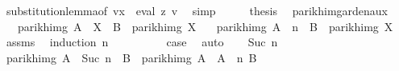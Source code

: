 \begin{isabellebody}
\ substitution{\isacharunderscore}{\kern0pt}lemma{\isacharbrackleft}{\kern0pt}of\ {\isachardoublequoteopen}{\isacharquery}{\kern0pt}v{\isacharprime}{\kern0pt}{\isacharparenleft}{\kern0pt}x\ {\isacharcolon}{\kern0pt}{\isacharequal}{\kern0pt}\ eval\ z\ v{\isacharparenright}{\kern0pt}{\isachardoublequoteclose}{\isacharbrackright}{\kern0pt}\ \isamarkupfalse%
\ simp\isanewline
\ \ \isamarkupfalse%
\ \isamarkupfalse%
\ {\isacharquery}{\kern0pt}thesis\ \isakeywordONE{{\isachardot}{\kern0pt}}\isamarkupfalse%
\isanewline
{}\isamarkupfalse%
%
\endisatagproof
{\isafoldproof}%
%
\isadelimproof
%
\endisadelimproof
%
\isadelimdocument
%
\endisadelimdocument
%
\isatagdocument
%
\isamarkuptrue%
%
\endisatagdocument
{\isafolddocument}%
%
\isadelimdocument
%
\endisadelimdocument
{}\isamarkupfalse%
\ parikh{\isacharunderscore}{\kern0pt}img{\isacharunderscore}{\kern0pt}arden{\isacharunderscore}{\kern0pt}aux{\isacharcolon}{\kern0pt}\isanewline
\ \ \ {\isachardoublequoteopen}parikh{\isacharunderscore}{\kern0pt}img\ {\isacharparenleft}{\kern0pt}A\ {\isacharat}{\kern0pt}{\isacharat}{\kern0pt}\ X\ {\isasymunion}\ B{\isacharparenright}{\kern0pt}\ {\isasymsubseteq}\ parikh{\isacharunderscore}{\kern0pt}img\ X{\isachardoublequoteclose}\isanewline
\ \ \ {\isachardoublequoteopen}parikh{\isacharunderscore}{\kern0pt}img\ {\isacharparenleft}{\kern0pt}A\ {\isacharcircum}{\kern0pt}{\isacharcircum}{\kern0pt}\ n\ {\isacharat}{\kern0pt}{\isacharat}{\kern0pt}\ B{\isacharparenright}{\kern0pt}\ {\isasymsubseteq}\ parikh{\isacharunderscore}{\kern0pt}img\ X{\isachardoublequoteclose}\isanewline
%
\isadelimproof
%
\endisadelimproof
%
\isatagproof
{}\isamarkupfalse%
\ assms\ \isamarkupfalse%
\ {\isacharparenleft}{\kern0pt}induction\ n{\isacharparenright}{\kern0pt}\isanewline
\ \ \isamarkupfalse%
\ {}\isanewline
\ \ \isamarkupfalse%
\ \isamarkupfalse%
\ {\isacharquery}{\kern0pt}case\ \isamarkupfalse%
\ auto\isanewline
{}\isamarkupfalse%
\isanewline
\ \ \isamarkupfalse%
\ {\isacharparenleft}{\kern0pt}Suc\ n{\isacharparenright}{\kern0pt}\isanewline
\ \ \isamarkupfalse%
\ \isamarkupfalse%
\ {\isachardoublequoteopen}parikh{\isacharunderscore}{\kern0pt}img\ {\isacharparenleft}{\kern0pt}A\ {\isacharcircum}{\kern0pt}{\isacharcircum}{\kern0pt}\ {\isacharparenleft}{\kern0pt}Suc\ n{\isacharparenright}{\kern0pt}\ {\isacharat}{\kern0pt}{\isacharat}{\kern0pt}\ B{\isacharparenright}{\kern0pt}\ {\isasymsubseteq}\ parikh{\isacharunderscore}{\kern0pt}img\ {\isacharparenleft}{\kern0pt}A\ {\isacharat}{\kern0pt}{\isacharat}{\kern0pt}\ A\ {\isacharcircum}{\kern0pt}{\isacharcircum}{\kern0pt}\ n\ {\isacharat}{\kern0pt}{\isacharat}{\kern0pt}B{\isacharparenright}{\kern0pt}{\isachardoublequoteclose}\isanewline

\end{isabellebody}
